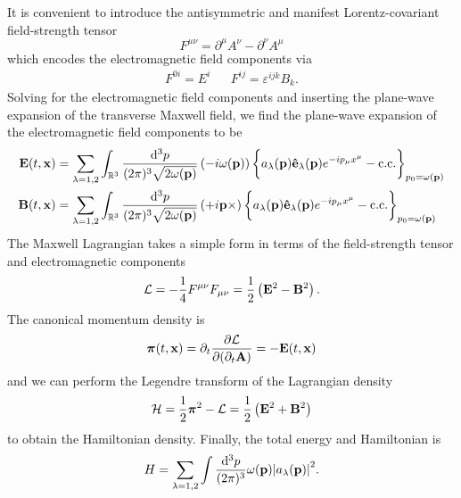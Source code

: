 It is convenient to introduce the antisymmetric and manifest Lorentz-covariant field-strength tensor
\begin{equation}
	F^{\mu\nu}
	=
	\partial^\mu A^\nu
	-
	\partial^\nu A^\mu
\end{equation}
which encodes the electromagnetic field components via
\begin{align}
	F^{0i}
	=
	E^i
	&&
	F^{ij}
	=
	\varepsilon^{ijk}
	B_k
	.
\end{align}
Solving for the electromagnetic field components and inserting the plane-wave expansion of the transverse Maxwell field, we find the plane-wave expansion of the electromagnetic field components to be
\begin{align}
	\vb{E}(t,\vb{x})
	&=
	\sum_{\lambda=1,2}
	\int_{\mathbb{R}^3}
	\frac{\dd[3]{p}}{(2\pi)^3\sqrt{2\omega(\vb{p})}}
	\left(-i\omega(\vb{p})\right)
	\biggl\{
		a_\lambda(\vb{p})
		\vu{e}_\lambda(\vb{p})
		e^{-ip_\mu x^\mu}
		-
		\text{c.c.}
	\biggr\}_{p_0=\omega(\vb{p})}
	\\
	\vb{B}(t,\vb{x})
	&=
	\sum_{\lambda=1,2}
	\int_{\mathbb{R}^3}
	\frac{\dd[3]{p}}{(2\pi)^3\sqrt{2\omega(\vb{p})}}
	\left(+i\vb{p}\times\right)
	\biggl\{
		a_\lambda(\vb{p})
		\vu{e}_\lambda(\vb{p})
		e^{-ip_\mu x^\mu}
		-
		\text{c.c.}
	\biggr\}_{p_0=\omega(\vb{p})}
\end{align}
The Maxwell Lagrangian takes a simple form in terms of the field-strength tensor and electromagnetic components 
\begin{equation}
	\mathcal{L}
	=
	-\frac{1}{4}
	F^{\mu\nu}
	F_{\mu\nu}
	=
	\frac{1}{2}
	\left(
		\vb{E}^2
		-
		\vb{B}^2
	\right)
	.
\end{equation}
The canonical momentum density is
\begin{equation}
	\boldsymbol{\pi}(t,\vb{x})
	=
	\partial_t
	\pdv{\mathcal{L}}{(\partial_t\vb{A})}
	=
	-\vb{E}(t,\vb{x})
\end{equation}
and we can perform the Legendre transform of the Lagrangian density
\begin{equation}
	\mathcal{H}
	=
	\frac{1}{2}
	\boldsymbol{\pi}^2
	-
	\mathcal{L}
	=
	\frac{1}{2}
	\left(
		\vb{E}^2
		+
		\vb{B}^2
	\right)
\end{equation}
to obtain the Hamiltonian density.
Finally, the total energy and Hamiltonian is
\begin{equation}
	H
	=
	\sum_{\lambda=1,2}
	\int\frac{\dd[3]{p}}{(2\pi)^3}
	\omega(\vb{p})
	\abs{a_\lambda(\vb{p})}^2
	.
\end{equation}

